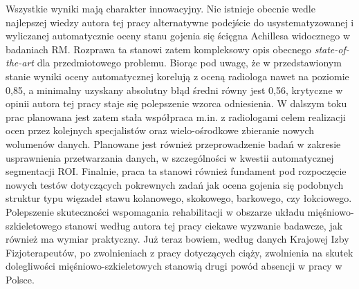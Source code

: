 Wszystkie wyniki mają charakter innowacyjny. Nie istnieje obecnie wedle najlepszej wiedzy autora tej pracy alternatywne podejście do usystematyzowanej i wyliczanej automatycznie oceny stanu gojenia się ścięgna Achillesa widocznego w badaniach RM. Rozprawa ta stanowi zatem kompleksowy opis obecnego \textit{state-of-the-art} dla przedmiotowego problemu. Biorąc pod uwagę, że w przedstawionym stanie wyniki oceny automatycznej korelują z oceną radiologa nawet na poziomie 0,85, a minimalny uzyskany absolutny błąd średni równy jest 0,56, krytyczne w opinii autora tej pracy staje się polepszenie wzorca odniesienia. W dalszym toku prac planowana jest zatem stała współpraca m.in. z radiologami celem realizacji ocen przez kolejnych specjalistów oraz wielo-ośrodkowe zbieranie nowych wolumenów danych. Planowane jest również przeprowadzenie badań w zakresie usprawnienia przetwarzania danych, w szczególności w kwestii automatycznej segmentacji ROI. Finalnie, praca ta stanowi również fundament pod rozpoczęcie nowych testów dotyczących pokrewnych zadań jak ocena gojenia się podobnych struktur typu więzadeł stawu kolanowego, skokowego, barkowego, czy łokciowego. Polepszenie skuteczności wspomagania rehabilitacji w obszarze układu mięśniowo-szkieletowego stanowi według autora tej pracy ciekawe wyzwanie badawcze, jak również ma wymiar praktyczny. Już teraz bowiem, według danych Krajowej Izby Fizjoterapeutów, po zwolnieniach z pracy dotyczących ciąży, zwolnienia na skutek dolegliwości mięśniowo-szkieletowych stanowią drugi powód absencji w pracy w Polsce.




